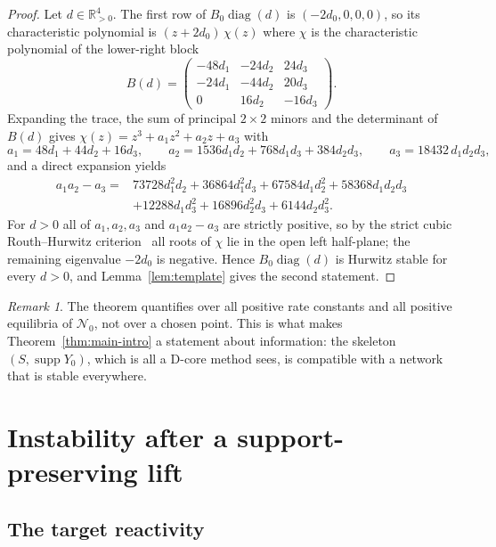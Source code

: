 \documentclass[11pt,a4paper]{article}
\theoremstyle{plain}
\theoremstyle{definition}
\theoremstyle{remark}
\newtheorem{remark}[theorem]{Remark}
\newcommand{\R}{\mathbb{R}}
\newcommand{\diag}{\operatorname{diag}}
\newcommand{\supp}{\operatorname{supp}}
\begin{document}
\begin{proof}
Let $d\in\R^4_{>0}$. The first row of $B_0\diag(d)$ is $(-2d_0,0,0,0)$, so its characteristic polynomial is $(z+2d_0)\,\chi(z)$ where $\chi$ is the characteristic polynomial of the lower-right block
\[
  B(d)=\begin{pmatrix}-48d_1&-24d_2&24d_3\\-24d_1&-44d_2&20d_3\\0&16d_2&-16d_3\end{pmatrix}.
\]
Expanding the trace, the sum of principal $2\times2$ minors and the determinant of $B(d)$ gives $\chi(z)=z^3+a_1z^2+a_2z+a_3$ with
\begin{equation}\label{eq:cubic}
  a_1=48d_1+44d_2+16d_3,\qquad
  a_2=1536d_1d_2+768d_1d_3+384d_2d_3,\qquad
  a_3=18432\,d_1d_2d_3,
\end{equation}
and a direct expansion yields
\begin{equation}\label{eq:delta}
\begin{aligned}
  a_1a_2-a_3={}&73728d_1^2d_2+36864d_1^2d_3+67584d_1d_2^2+58368d_1d_2d_3\\
  &+12288d_1d_3^2+16896d_2^2d_3+6144d_2d_3^2 .
\end{aligned}
\end{equation}
For $d>0$ all of $a_1,a_2,a_3$ and $a_1a_2-a_3$ are strictly positive, so by the strict cubic Routh--Hurwitz criterion~\cite[Ch.~XV]{Gantmacher1959} all roots of $\chi$ lie in the open left half-plane; the remaining eigenvalue $-2d_0$ is negative. Hence $B_0\diag(d)$ is Hurwitz stable for every $d>0$, and Lemma~\ref{lem:template} gives the second statement.
\end{proof}

\begin{remark}
The theorem quantifies over all positive rate constants and all positive equilibria of $\mathcal N_0$, not over a chosen point. This is what makes Theorem~\ref{thm:main-intro} a statement about information: the skeleton $(S,\supp Y_0)$, which is all a D-core method sees, is compatible with a network that is stable everywhere.
\end{remark}

\section{Instability after a support-preserving lift}\label{sec:unstable}

\subsection{The target reactivity}
\end{document}
